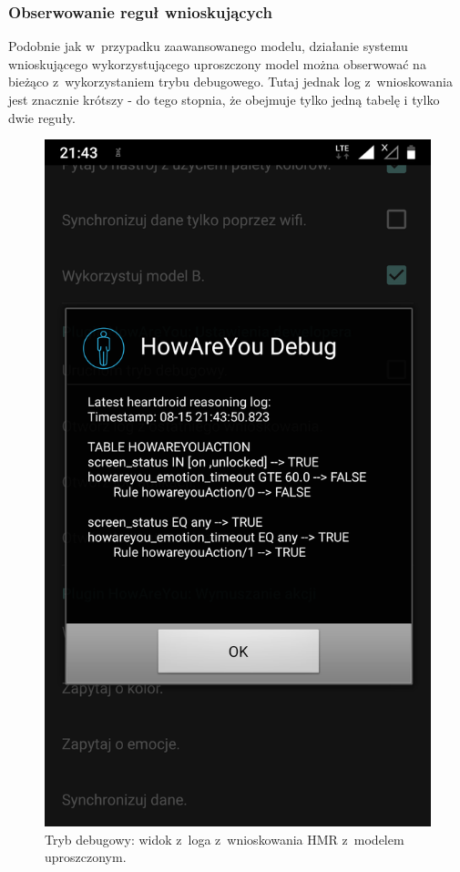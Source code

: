 \subsubsection{Obserwowanie reguł wnioskujących}

Podobnie jak w~przypadku zaawansowanego modelu, działanie systemu wnioskującego wykorzystującego uproszczony model można obserwować na bieżąco z~wykorzystaniem trybu debugowego. Tutaj jednak log z~wnioskowania jest znacznie krótszy - do tego stopnia, że obejmuje tylko jedną tabelę i tylko dwie reguły.

\begin{figure}[H]
	\centering
	\includegraphics[scale=0.15]{rozdzial4/HMR_screenshots_B.png}
	\caption{Tryb debugowy: widok z~loga z~wnioskowania HMR z~modelem uproszczonym.}
\end{figure}

